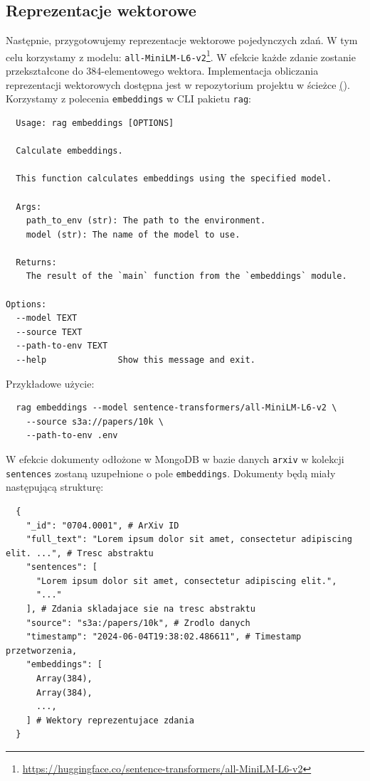 \documentclass[10pt]{article}
\begin{document}
\subsection{Reprezentacje wektorowe}

Następnie, przygotowujemy reprezentacje wektorowe pojedynczych zdań. W tym celu korzystamy z modelu: \texttt{all-MiniLM-L6-v2}\footnote{\url{https://huggingface.co/sentence-transformers/all-MiniLM-L6-v2}}. W efekcie każde zdanie zostanie przekształcone do 384-elementowego wektora. Implementacja obliczania reprezentacji wektorowych dostępna jest w repozytorium projektu w ścieżce \href{https://github.com/stasulam/pw-big-data-thesis-public/blob/main/src/rag/processor/embeddings.py}(). Korzystamy z polecenia \texttt{embeddings} w CLI pakietu \texttt{rag}:

\begin{lstlisting}
  Usage: rag embeddings [OPTIONS]

  Calculate embeddings.

  This function calculates embeddings using the specified model.

  Args:
    path_to_env (str): The path to the environment.
    model (str): The name of the model to use.

  Returns: 
    The result of the `main` function from the `embeddings` module.

Options:
  --model TEXT
  --source TEXT
  --path-to-env TEXT
  --help              Show this message and exit.
\end{lstlisting}

Przykładowe użycie:
\begin{lstlisting}
  rag embeddings --model sentence-transformers/all-MiniLM-L6-v2 \
    --source s3a://papers/10k \
    --path-to-env .env
\end{lstlisting}

W efekcie dokumenty odłożone w MongoDB w bazie danych \texttt{arxiv} w kolekcji \texttt{sentences} zostaną uzupełnione o pole \texttt{embeddings}. Dokumenty będą miały następującą strukturę:

\begin{lstlisting}
  {
    "_id": "0704.0001", # ArXiv ID
    "full_text": "Lorem ipsum dolor sit amet, consectetur adipiscing elit. ...", # Tresc abstraktu
    "sentences": [
      "Lorem ipsum dolor sit amet, consectetur adipiscing elit.",
      "..."
    ], # Zdania skladajace sie na tresc abstraktu
    "source": "s3a:/papers/10k", # Zrodlo danych
    "timestamp": "2024-06-04T19:38:02.486611", # Timestamp przetworzenia,
    "embeddings": [
      Array(384),
      Array(384),
      ...,
    ] # Wektory reprezentujace zdania
  }
\end{lstlisting}
\end{document}
